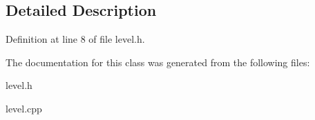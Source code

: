 \subsection{Detailed Description}


Definition at line 8 of file level.\+h.



The documentation for this class was generated from the following files\+:\begin{DoxyCompactItemize}
\item 
level.\+h\item 
level.\+cpp\end{DoxyCompactItemize}
